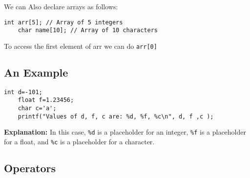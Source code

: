 \documentclass[a4paper, 10pt]{article}
\begin{document}
We can Also declare arrays as follows:
\begin{lstlisting}[style=cStyle, caption={Declaring Arrays}]
    int arr[5]; // Array of 5 integers
    char name[10]; // Array of 10 characters
\end{lstlisting}
To access the first element of arr we can do \texttt{arr[0]}
\subsection{An Example}
\begin{lstlisting}[style=cStyle, caption={Example of Variables}]
    int d=-101;
    float f=1.23456;
    char c='a';
    printf("Values of d, f, c are: %d, %f, %c\n", d, f ,c );
\end{lstlisting}
\textbf{Explanation:} In this case, \texttt{\%d} is a placeholder for an integer, \texttt{\%f} is a placeholder for a float, and \texttt{\%c} is a placeholder for a character.

\subsection{Operators}
\end{document}
